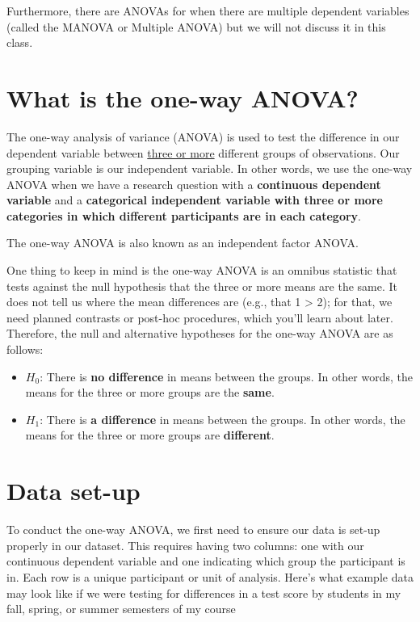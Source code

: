 \documentclass[
]{book}
\providecommand{\tightlist}{%
  \setlength{\itemsep}{0pt}\setlength{\parskip}{0pt}}
\begin{document}
Furthermore, there are ANOVAs for when there are multiple dependent variables (called the MANOVA or Multiple ANOVA) but we will not discuss it in this class.

\hypertarget{what-is-the-one-way-anova}{%
\section{What is the one-way ANOVA?}\label{what-is-the-one-way-anova}}

The one-way analysis of variance (ANOVA) is used to test the difference in our dependent variable between \underline{three or more} different groups of observations. Our grouping variable is our independent variable. In other words, we use the one-way ANOVA when we have a research question with a \textbf{continuous dependent variable} and a \textbf{categorical independent variable with three or more categories in which different participants are in each category}.

The one-way ANOVA is also known as an independent factor ANOVA.

One thing to keep in mind is the one-way ANOVA is an omnibus statistic that tests against the null hypothesis that the three or more means are the same. It does not tell us where the mean differences are (e.g., that 1 \textgreater{} 2); for that, we need planned contrasts or post-hoc procedures, which you'll learn about later. Therefore, the null and alternative hypotheses for the one-way ANOVA are as follows:

\begin{itemize}
\tightlist
\item
  \(H_0\): There is \textbf{no difference} in means between the groups. In other words, the means for the three or more groups are the \textbf{same}.
\item
  \(H_1\): There is \textbf{a difference} in means between the groups. In other words, the means for the three or more groups are \textbf{different}.
\end{itemize}

\hypertarget{data-set-up-2}{%
\section{Data set-up}\label{data-set-up-2}}

To conduct the one-way ANOVA, we first need to ensure our data is set-up properly in our dataset. This requires having two columns: one with our continuous dependent variable and one indicating which group the participant is in. Each row is a unique participant or unit of analysis. Here's what example data may look like if we were testing for differences in a test score by students in my fall, spring, or summer semesters of my course
\end{document}
